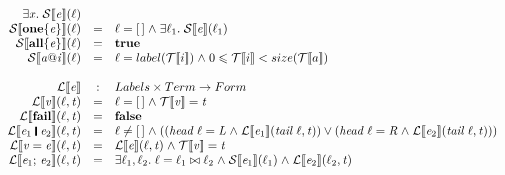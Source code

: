 \documentclass[acmsmall,review,dvipsnames]{acmart}
\newcommand{\Conid}[1]{\mathit{#1}}
\newcommand{\Varid}[1]{\mathit{#1}}
\renewcommand{\leq}{\leqslant}
\newcommand{\Term}{Term}
\newcommand{\Labels}{Labels}
\newcommand{\Forml}{Form}
\newcommand{\semfun}[1]{\mathcal{#1}}
\newcommand{\folapp}[2]{\semfun{L}\llbracket #1 \rrbracket #2}
\newcommand{\sfolapp}[2]{\semfun{S}\llbracket #1 \rrbracket #2}
\newcommand{\termapp}[2]{\semfun{T}\llbracket #1 \rrbracket #2}
\begin{document}
\begin{figure}
$$\begin{array}{rcll}
    \exists \ensuremath{\Varid{x}} . \; \sfolapp{\ensuremath{\Varid{e}}}(\ensuremath{\ell}) \\
  \sfolapp{\ensuremath{\textbf{one}\{\Varid{e}\}}}(\ensuremath{\ell}) & = & \ensuremath{\ell\mathrel{=}[\mskip1.5mu \mskip1.5mu]\mathrel{\wedge}} \exists \ensuremath{\ell_1} . \;  \sfolapp{\ensuremath{\Varid{e}}}(\ensuremath{\ell_1}) \\
  \sfolapp{\ensuremath{\textbf{all}\{\Varid{e}\}}}(\ensuremath{\ell}) & = & \ensuremath{\textbf{true}} \\
  \sfolapp{\ensuremath{\Varid{a}\mathord{@}\Varid{i}}}(\ensuremath{\ell}) & = & \ensuremath{\ell\mathrel{=}} label(\termapp{i}) \ensuremath{\mathrel{\wedge}} 0 \leq \termapp{i} < size(\termapp{a}) \\
~ \\
  \folapp{\ensuremath{\Varid{e}}} & : & \Labels \times \Term \rightarrow \Forml \\
  \folapp{\ensuremath{\Varid{v}}}(\ensuremath{\ell,\Varid{t}}) & = & \ensuremath{\ell\mathrel{=}[\mskip1.5mu \mskip1.5mu]\mathrel{\wedge}\termapp{\Varid{v}}\mathrel{=}\Varid{t}} \\
  \folapp{\ensuremath{\textbf{fail}}}(\ensuremath{\ell,\Varid{t}}) & = & \ensuremath{\textbf{false}} \\
  \folapp{\ensuremath{\Varid{e}_{\mathrm{1}}\;\rule[-0.1em]{0.15em}{0.75em}\;\Varid{e}_{\mathrm{2}}}}(\ensuremath{\ell,\Varid{t}}) & = &
    \ensuremath{\ell} \not= \ensuremath{[\mskip1.5mu \mskip1.5mu]\mathrel{\wedge}((\Varid{head}\;\ell\mathrel{=}\Conid{L}\mathrel{\wedge}} \folapp{\ensuremath{\Varid{e}_{\mathrm{1}}}}(\ensuremath{\Varid{tail}\;\ell,\Varid{t}}))
    \vee (\ensuremath{\Varid{head}\;\ell\mathrel{=}\Conid{R}\mathrel{\wedge}} \folapp{\ensuremath{\Varid{e}_{\mathrm{2}}}}(\ensuremath{\Varid{tail}\;\ell,\Varid{t}}))) \\
  \folapp{\ensuremath{\Varid{v}\mathrel{=}\Varid{e}}}(\ensuremath{\ell,\Varid{t}}) & = &
    \folapp{\ensuremath{\Varid{e}}}(\ensuremath{\ell,\Varid{t}}) \ensuremath{\mathrel{\wedge}} \termapp{\ensuremath{\Varid{v}}} = \ensuremath{\Varid{t}} \\
  \folapp{\ensuremath{\Varid{e}_{\mathrm{1}};\,\Varid{e}_{\mathrm{2}}}}(\ensuremath{\ell,\Varid{t}}) & = &
  \exists \ensuremath{\ell_1,\ell_2} . \; \ensuremath{\ell\mathrel{=}\ell_1\bowtie\ell_2\mathrel{\wedge}} 
    \sfolapp{\ensuremath{\Varid{e}_{\mathrm{1}}}}(\ensuremath{\ell_1}) \ensuremath{\mathrel{\wedge}} \folapp{\ensuremath{\Varid{e}_{\mathrm{2}}}}(\ensuremath{\ell_2,\Varid{t}}) \\

\end{array}$$
\end{figure}
\end{document}
